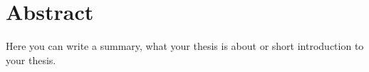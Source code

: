 \chapter*{Abstract}

Here you can write a summary, what your thesis is about or short introduction to your thesis.

\bt
